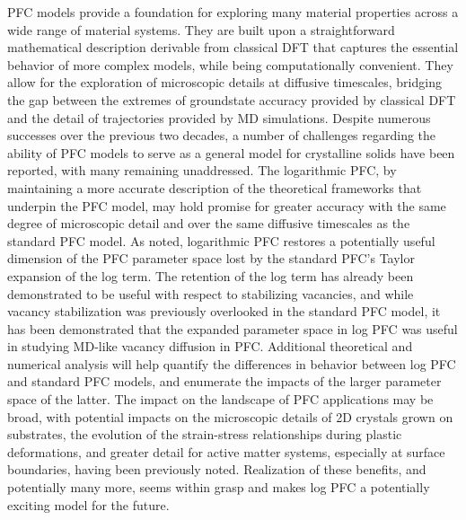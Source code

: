 PFC models provide a foundation for exploring many material properties across a wide range of material systems.  They are built upon a straightforward mathematical description derivable from classical DFT that captures the essential behavior of more complex models, while being computationally convenient.  They allow for the exploration of microscopic details at diffusive timescales, bridging the gap between the extremes of groundstate accuracy provided by classical DFT and the detail of trajectories provided by MD simulations.  Despite numerous successes over the previous two decades, a number of challenges regarding the ability of PFC models to serve as a general model for crystalline solids have been reported, with many remaining unaddressed.  The logarithmic PFC, by maintaining a more accurate description of the theoretical frameworks that underpin the PFC model, may hold promise for greater accuracy with the same degree of microscopic detail and over the same diffusive timescales as the standard PFC model.  As noted, logarithmic PFC restores a potentially useful dimension of the PFC parameter space lost by the standard PFC's Taylor expansion of the log term.  The retention of the log term has already been demonstrated to be useful with respect to stabilizing vacancies, and while vacancy stabilization was previously overlooked in the standard PFC model, it has been demonstrated that the expanded parameter space in log PFC was useful in studying MD-like vacancy diffusion in PFC.  Additional theoretical and numerical analysis will help quantify the differences in behavior between log PFC and standard PFC models, and enumerate the impacts of the larger parameter space of the latter.  The impact on the landscape of PFC applications may be broad, with potential impacts on the microscopic details of 2D crystals grown on substrates, the evolution of the strain-stress relationships during plastic deformations, and greater detail for active matter systems, especially at surface boundaries, having been previously noted.  Realization of these benefits, and potentially many more, seems within grasp and makes log PFC a potentially exciting model for the future.